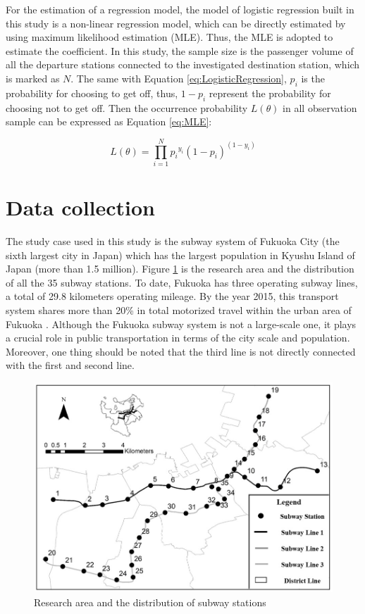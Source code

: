\documentclass[utf8]{article}
\begin{document}
For the estimation of a regression model, the model of logistic regression built in this study is a non-linear regression model, which can be directly estimated by using maximum likelihood estimation (MLE). Thus, the MLE is adopted to estimate the coefficient. In this study, the sample size is the passenger volume of all the departure stations connected to the investigated destination station, which is marked as $N$. The same with Equation \ref{eq:LogisticRegression}, $p_i$ is the probability for choosing to get off, thus, $1-p_i$ represent the probability for choosing not to get off. Then the occurrence probability $L(\theta)$ in all observation sample can be expressed as Equation \ref{eq:MLE}:

\begin{equation}
L(\theta)=\prod_{i=1}^{N}{p_i}^{y_i}(1-p_i)^{(1-y_i)}
\label{eq:MLE}
\end{equation}


\section{Data collection}
%
\indent

%
The study case used in this study is the subway system of Fukuoka City (the sixth largest city in Japan) which has the largest population in Kyushu Island of Japan (more than 1.5 million). Figure \ref{fig:ResearchArea} is the research area and the distribution of all the 35 subway stations. To date, Fukuoka has three operating subway lines, a total of 29.8 kilometers operating mileage. By the year 2015, this transport system shares more than 20\% in total motorized travel within the urban area of Fukuoka \cite{Bureau2014fukuoka}. Although the Fukuoka subway system is not a large-scale one, it plays a crucial role in public transportation in terms of the city scale and population. Moreover, one thing should be noted that the third line is not directly connected with the first and second line.

\begin{figure}[htbp]
	\centering
	\includegraphics[width=\linewidth]{ResearchArea}
	\caption{Research area and the distribution of subway stations}
	\label{fig:ResearchArea}
\end{figure}
\end{document}
